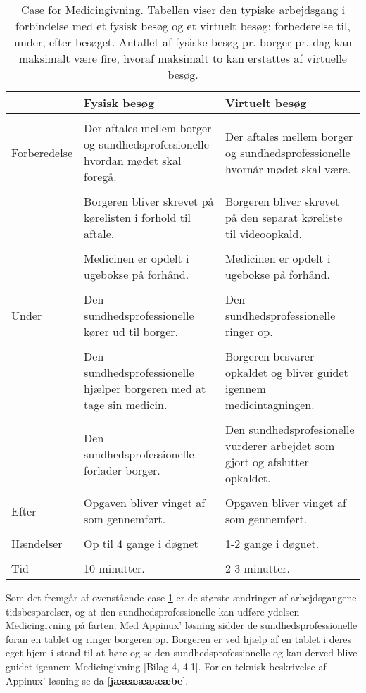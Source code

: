 \begin{table}[H]
	\caption{Case for Medicingivning. Tabellen viser den typiske arbejdsgang i forbindelse med et fysisk besøg og et virtuelt besøg; forbederelse til, under, efter besøget. Antallet af fysiske besøg pr. borger pr. dag kan maksimalt være fire, hvoraf maksimalt to kan erstattes af virtuelle besøg.}
	\centering
	\label{tab:Case}
	\begin{tabularx}{\textwidth}{|l|X|X|}
		
		\hline
		  & \textbf{Fysisk besøg} & \textbf{Virtuelt besøg}\\ \hline
		& & \\Forberedelse & Der aftales mellem borger og sundhedsprofessionelle hvordan mødet skal foregå. & Der aftales mellem borger og sundhedsprofessionelle hvornår mødet skal være.\\ & &\\
		 & Borgeren bliver skrevet på kørelisten i forhold til aftale. & Borgeren bliver skrevet på den separat køreliste til videoopkald.\\  & &\\
		 & Medicinen er opdelt i ugebokse på forhånd. & Medicinen er opdelt i ugebokse på forhånd.\\[4ex] \hline & & \\
		 Under & Den sundhedsprofessionelle kører ud til borger. & Den sundhedsprofessionelle ringer op.\\  & &\\
		  & Den sundhedsprofessionelle hjælper borgeren med at tage sin medicin. & Borgeren besvarer opkaldet og bliver guidet igennem medicintagningen.\\ & &\\
		  & Den sundhedsprofessionelle forlader borger. & Den sundhedsprofesionelle vurderer arbejdet som gjort og afslutter opkaldet.\\[4ex] \hline & & \\Efter & Opgaven bliver vinget af som gennemført. & Opgaven bliver vinget af som gennemført.\\[4ex] \hline
		  & & \\Hændelser & Op til 4 gange i døgnet & 1-2 gange i døgnet.\\ [4ex] \hline
		  & & \\Tid & 10 minutter. & 2-3 minutter.\\[4ex] \hline
	\end{tabularx}
\end{table}

Som det fremgår af ovenstående case \ref{tab:Case} er de største ændringer af arbejdsgangene tidsbesparelser, og at den sundhedsprofessionelle kan udføre ydelsen Medicingivning på farten. Med Appinux' løsning sidder de sundhedsprofessionelle foran en tablet og ringer borgeren op. Borgeren er ved hjælp af en tablet i deres eget hjem i stand til at høre og se den sundhedsprofessionelle og kan derved blive guidet igennem Medicingivning [Bilag 4, 4.1]. For en teknisk beskrivelse af Appinux' løsning se da [\textbf{jæææææææbe}].


